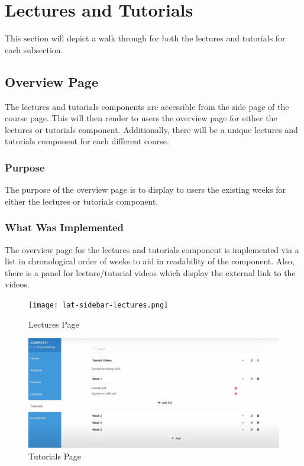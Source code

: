 \section{Lectures and Tutorials}
This section will depict a walk through for both the lectures and tutorials for each subsection.

\subsection{Overview Page}
The lectures and tutorials components are accessible from the side page of the course page. This will then render to users the overview page for either the lectures or tutorials component. Additionally, there will be a unique lectures and tutorials component for each different course.

\subsubsection{Purpose}
The purpose of the overview page is to display to users the existing weeks for either the lectures or tutorials component.

\subsubsection{What Was Implemented}
The overview page for the lectures and tutorials component is implemented via a list in chronological order of weeks to aid in readability of the component. Also, there is a panel for lecture/tutorial videos which display the external link to the videos.

\begin{figure}[h!]
    \texttt{[image: lat-sidebar-lectures.png]}
    \centering
    \caption{Lectures Page}
\end{figure}

\begin{figure}[h!]
    \includegraphics[scale=0.3]{images/lat-sidebar-tutorials.png}
    \centering
    \caption{Tutorials Page}
\end{figure}

